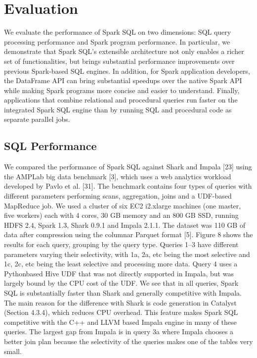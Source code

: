 \documentclass[runningheads,a4paper]{llncs}
\begin{document}
\section{Evaluation}
We evaluate the performance of Spark SQL on two dimensions: SQL query processing performance and Spark program performance. In particular, we demonstrate that Spark SQL’s extensible architecture not only enables a richer set of functionalities, but brings substantial performance improvements over previous Spark-based SQL engines. In addition, for Spark application developers, the DataFrame API can bring substantial speedups over the native Spark API while making Spark programs more concise and easier to understand. Finally, applications that combine relational and procedural queries run faster on the integrated Spark SQL engine than by running SQL and procedural code as separate parallel jobs.

\subsection{SQL Performance}

We compared the performance of Spark SQL against Shark and Impala [23] using the AMPLab big data benchmark [3], which uses a web analytics workload developed by Pavlo et al. [31]. The benchmark contains four types of queries with different parameters performing scans, aggregation, joins and a UDF-based MapReduce job. We used a cluster of six EC2 i2.xlarge machines (one master, five workers) each with 4 cores, 30 GB memory and an 800 GB SSD, running HDFS 2.4, Spark 1.3, Shark 0.9.1 and Impala 2.1.1. The dataset was 110 GB of data after compression using the columnar Parquet format [5].
Figure 8 shows the results for each query, grouping by the query type. Queries 1–3 have different parameters varying their selectivity, with 1a, 2a, etc being the most selective and 1c, 2c, etc being the least selective and processing more data. Query 4 uses a Pythonbased Hive UDF that was not directly supported in Impala, but was largely bound by the CPU cost of the UDF.
We see that in all queries, Spark SQL is substantially faster than Shark and generally competitive with Impala. The main reason for the difference with Shark is code generation in Catalyst (Section 4.3.4), which reduces CPU overhead. This feature makes Spark SQL competitive with the C++ and LLVM based Impala engine in many of these queries. The largest gap from Impala is in query 3a where Impala chooses a better join plan because the selectivity of the queries makes one of the tables very small.
\end{document}
